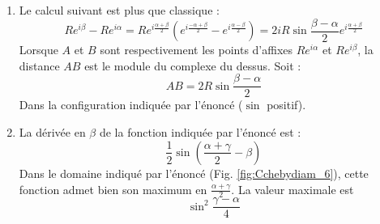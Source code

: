 \begin{enumerate}
\begin{enumerate}
 \item Le calcul suivant est plus que classique :
 \begin{displaymath}
 Re^{i\beta} - R e^{i\alpha} = Re^{i\frac{\alpha + \beta}{2}}
\left( e^{i\frac{-\alpha + \beta}{2}} - e^{i\frac{\alpha - \beta}{2}}\right)  = 
2iR\sin\frac{\beta -\alpha}{2}e^{i\frac{\alpha + \beta}{2}}
\end{displaymath}
Lorsque $A$ et $B$ sont respectivement les points d'affixes $Re^{i\alpha}$ et $Re^{i\beta}$, la distance $AB$ est le module du complexe du dessus. Soit :
\begin{displaymath}
 AB = 2R\sin\frac{\beta -\alpha}{2}
\end{displaymath}
Dans la configuration indiquée par l'énoncé ($\sin$ positif).
\item La dérivée en $\beta$ de la fonction indiquée par l'énoncé est :
\begin{displaymath}
 \frac{1}{2}\sin\left( \frac{\alpha + \gamma}{2}-\beta\right) 
\end{displaymath}
Dans le domaine indiqué par l'énoncé (Fig. \ref{fig:Cchebydiam_6}), cette fonction admet bien son maximum en $\frac{\alpha + \gamma}{2}$. La valeur maximale est 
\begin{displaymath}
  \sin^2 \frac{\gamma - \alpha}{4}
\end{displaymath}


\end{enumerate}
\end{enumerate}
